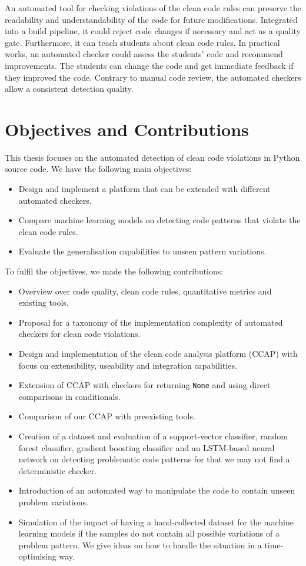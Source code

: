 An automated tool for checking violations of the clean code rules can preserve the readability and understandability of the code for future modifications. Integrated into a build pipeline, it could reject code changes if necessary and act as a quality gate.
Furthermore, it can teach students about clean code rules. In practical works, an automated checker could assess the students' code and recommend improvements. The students can change the code and get immediate feedback if they improved the code. Contrary to manual code review, the automated checkers allow a consistent detection quality.


\section{Objectives and Contributions}
This thesis focuses on the automated detection of clean code violations in Python source code. 
We have the following main objectives:
\begin{itemize}
    \item Design and implement a platform that can be extended with different automated checkers.
    \item Compare machine learning models on detecting code patterns that violate the clean code rules.
    \item Evaluate the generalisation capabilities to unseen pattern variations.  
\end{itemize}

To fulfil the objectives, we made the following contributions:
\begin{itemize}
    \item Overview over code quality, clean code rules, quantitative metrics and existing tools.
    \item Proposal for a taxonomy of the implementation complexity of automated checkers for clean code violations.
    \item Design and implementation of the clean code analysis platform (CCAP) with focus on extensibility, useability and integration capabilities.
    \item Extension of CCAP with checkers for returning \texttt{None} and using direct comparisons in conditionals.
    \item Comparison of our CCAP with preexisting tools.
    \item Creation of a dataset and evaluation of a support-vector classifier, random forest classifier, gradient boosting classifier and an LSTM-based neural network on detecting problematic code patterns for that we may not find a deterministic checker.
    \item Introduction of an automated way to manipulate the code to contain unseen problem variations.
    \item Simulation of the impact of having a hand-collected dataset for the machine learning models if the samples do not contain all possible variations of a problem pattern. We give ideas on how to handle the situation in a time-optimising way.
\end{itemize}

